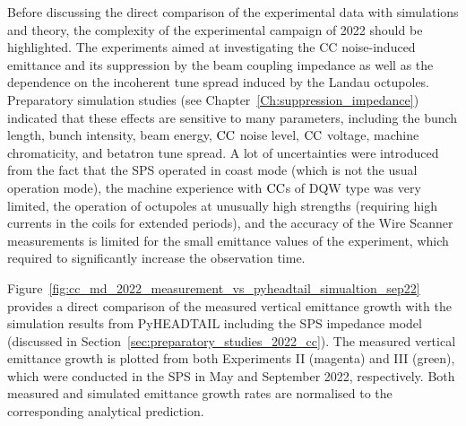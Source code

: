 Before discussing the direct comparison of the experimental data with simulations and theory, the complexity of the experimental campaign of 2022 should be highlighted. The experiments aimed at investigating the CC noise-induced emittance and its suppression by the beam coupling impedance as well as the dependence on the incoherent tune spread induced by the Landau octupoles. Preparatory simulation studies (see Chapter~\ref{Ch:suppression_impedance}) indicated that these effects are sensitive to many parameters, including the bunch length, bunch intensity, beam energy, ${\mathrm{CC}}$ noise level, ${\mathrm{CC}}$ voltage, machine chromaticity, and betatron tune spread. A lot of uncertainties were introduced from the fact that the SPS operated in coast mode (which is not the usual operation mode), the machine experience with ${\mathrm{CC}}$s of DQW type was very limited, the operation of octupoles at unusually high strengths (requiring high currents in the coils for extended periods), %
and the accuracy of the Wire Scanner measurements is limited for the small emittance values of the experiment, which required to significantly increase the observation time. %


Figure~\ref{fig:cc_md_2022_measurement_vs_pyheadtail_simualtion_sep22} provides a direct comparison of the measured vertical emittance growth with the simulation results from PyHEADTAIL including the SPS impedance model (discussed in Section~\ref{sec:preparatory_studies_2022_cc}). The measured vertical emittance growth is plotted from both Experiments II (magenta) and III (green), which were conducted in the SPS in May and September 2022, respectively. Both measured and simulated emittance growth rates are normalised to the corresponding analytical prediction.


